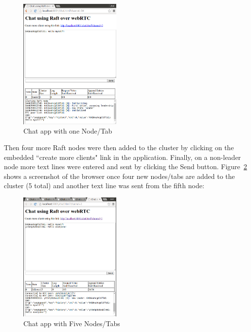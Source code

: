 \documentclass[conference,compsoc]{./IEEEtran/IEEEtran}
\begin{document}
\begin{figure}[!t]
    \centering
    \includegraphics[width=0.45\textwidth]{imgs/chat_1a.png}
    \caption{Chat app with one Node/Tab}
    \label{fig:browser_chat_1}
\end{figure}

Then four more Raft nodes were then added to the cluster by clicking
on the embedded ``create more clients" link in the application.
Finally, on a non-leader node more text lines were entered and sent by
clicking the Send button. Figure~\ref{fig:browser_chat_5} shows
a screenshot of the browser once four new nodes/tabs are added to the
cluster (5 total) and another text line was sent from the fifth node:

\begin{figure}[!t]
    \centering
    \includegraphics[width=0.45\textwidth]{imgs/chat_5a.png}
    \caption{Chat app with Five Nodes/Tabs}
    \label{fig:browser_chat_5}
\end{figure}
\end{document}
